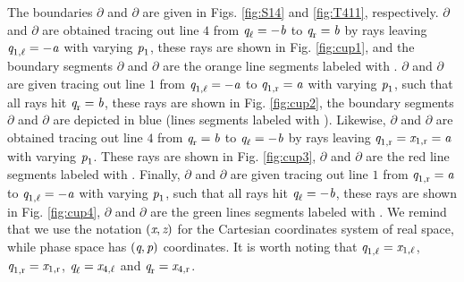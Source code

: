  The boundaries $\partial$ and $\partial$ are given in Figs. \ref{fig:S14} and \ref{fig:T411}, respectively.
$\partial$ and $\partial$ are obtained tracing out line $4$ from
$\textit{q}_{\ell} = -\textit{b}$ to $\textit{q}_{\textrm{r}} = \textit{b}$
 by rays leaving $\textit{q}_{1, \ell}= -\textit{a}$ with varying $\textit{p}_1$, these rays are shown in Fig. \ref{fig:cup1}, and the boundary segments
 $\partial$ and $\partial$ are the orange line segments labeled with . 
 $\partial$ and $\partial$ are given tracing out line $1$ from
 $\textit{q}_{1, \ell}= -\textit{a}$ to $\textit{q}_{1, \textrm{r}}= \textit{a}$
 with varying $\textit{p}_1$, such that all rays hit $\textit{q}_{\textrm{r}} = \textit{b}$, these rays are shown in Fig. \ref{fig:cup2}, the boundary segments
 $\partial$ and $\partial$ are depicted in blue (lines segments labeled with ).
 Likewise, $\partial$ and $\partial$ are obtained tracing out line $4$ from
$\textit{q}_{\textrm{r}}= \textit{b}$ to $\textit{q}_{\ell}= -\textit{b}$ 
 by rays leaving $\textit{q}_{1, \textrm{r}}=\textit{x}_{1, \textrm{r}} = \textit{a}$ with varying $\textit{p}_{1}$. These rays are shown in Fig. \ref{fig:cup3}, 
 $\partial$ and $\partial$ are the red line segments labeled with .
  Finally, $\partial$ and $\partial$ are given tracing out line $1$ from
$\textit{q}_{1, \textrm{r}} = \textit{a}$ to  $\textit{q}_{1, \ell} = -\textit{a}$ 
 with varying $\textit{p}_{1}$, such that all rays hit $\textit{q}_{\ell} = -\textit{b}$, these rays are shown in Fig. \ref{fig:cup4}, 
 $\partial$ and $\partial$ are the green lines segments labeled with . 
We remind that we use the notation $(\textit{x}, \textit{z})$ for the Cartesian coordinates system of real space, while phase space has $(\textit{q}, \textit{p})$ coordinates. 
It is worth noting that  $\textit{q}_{1, \ell}=\textit{x}_{1, \ell}$,  $\textit{q}_{1, \textrm{r}}=\textit{x}_{1, \textrm{r}}$,  
$\textit{q}_{\ell}=\textit{x}_{4, \ell}$ and  $\textit{q}_{\textrm{r}}=\textit{x}_{4, \textrm{r}}$.\\ \indent
